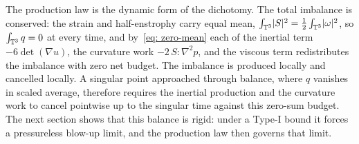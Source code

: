 The production law is the dynamic form of the dichotomy. The total imbalance is
conserved: the strain and half-enstrophy carry equal mean,
$\int_{\mathbb{T}^3}\lvert S \rvert^2 = \tfrac12\int_{\mathbb{T}^3}\lvert \omega \rvert^2$, so $\int_{\mathbb{T}^3} q = 0$
at every time, and by~\eqref{eq: zero-mean} each of the inertial term
$-6\det(\nabla u)$, the curvature work $-2\,S\!:\!\nabla^2 p$, and the viscous term
redistributes the imbalance with zero net budget. The imbalance is produced
locally and cancelled locally. A singular point approached through balance, where
$q$ vanishes in scaled average, therefore requires the inertial production and the
curvature work to cancel pointwise up to the singular time against this zero-sum
budget. The next section shows that this
balance is rigid: under a Type-I bound it forces a pressureless blow-up limit, and
the production law then governs that limit.
